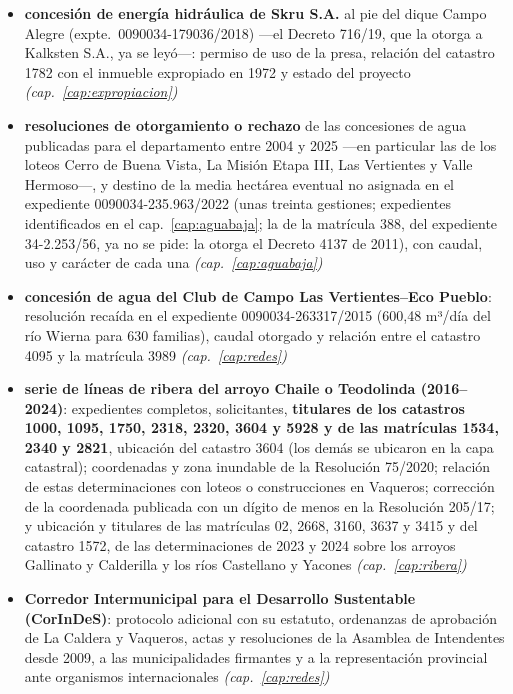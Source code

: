 \begin{itemize}[leftmargin=*]
\item \textbf{concesión de energía hidráulica de Skru S.A.} al pie del dique Campo Alegre (expte.\ 0090034-179036/2018) ---el Decreto 716/19, que la otorga a Kalksten S.A., ya se leyó---: permiso de uso de la presa, relación del catastro 1782 con el inmueble expropiado en 1972 y estado del proyecto \textit{(cap.\ \ref{cap:expropiacion})}
\item \textbf{resoluciones de otorgamiento o rechazo} de las concesiones de agua publicadas para el departamento entre 2004 y 2025 ---en particular las de los loteos Cerro de Buena Vista, La Misión Etapa III, Las Vertientes y Valle Hermoso---, y destino de la media hectárea eventual no asignada en el expediente 0090034-235.963/2022 (unas treinta gestiones; expedientes identificados en el cap.\ \ref{cap:aguabaja}; la de la matrícula 388, del expediente 34-2.253/56, ya no se pide: la otorga el Decreto 4137 de 2011), con caudal, uso y carácter de cada una \textit{(cap.\ \ref{cap:aguabaja})}
\item \textbf{concesión de agua del Club de Campo Las Vertientes--Eco Pueblo}: resolución recaída en el expediente 0090034-263317/2015 (600,48 m³/día del río Wierna para 630 familias), caudal otorgado y relación entre el catastro 4095 y la matrícula 3989 \textit{(cap.\ \ref{cap:redes})}
\item \textbf{serie de líneas de ribera del arroyo Chaile o Teodolinda (2016--2024)}: expedientes completos, solicitantes, \textbf{titulares de los catastros 1000, 1095, 1750, 2318, 2320, 3604 y 5928 y de las matrículas 1534, 2340 y 2821}, ubicación del catastro 3604 (los demás se ubicaron en la capa catastral); coordenadas y zona inundable de la Resolución 75/2020; relación de estas determinaciones con loteos o construcciones en Vaqueros; corrección de la coordenada publicada con un dígito de menos en la Resolución 205/17; y ubicación y titulares de las matrículas 02, 2668, 3160, 3637 y 3415 y del catastro 1572, de las determinaciones de 2023 y 2024 sobre los arroyos Gallinato y Calderilla y los ríos Castellano y Yacones \textit{(cap.\ \ref{cap:ribera})}
\item \textbf{Corredor Intermunicipal para el Desarrollo Sustentable (CorInDeS)}: protocolo adicional con su estatuto, ordenanzas de aprobación de La Caldera y Vaqueros, actas y resoluciones de la Asamblea de Intendentes desde 2009, a las municipalidades firmantes y a la representación provincial ante organismos internacionales \textit{(cap.\ \ref{cap:redes})}

\end{itemize}
